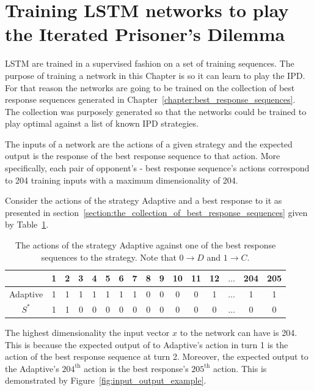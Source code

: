 \section{Training LSTM networks to play the Iterated Prisoner's Dilemma}\label{section:training_a_rnn}

LSTM are trained in a supervised fashion on a set of training sequences. The
purpose of training a network in this Chapter is so it can learn to play the
IPD. For that reason the networks are going to be trained on the collection of
best response sequences generated in
Chapter~\ref{chapter:best_response_sequences}. The collection was purposely generated
so that the networks could be trained to play optimal against a list of known
IPD strategies.

The inputs of a network are the actions of a given strategy and the expected
output is the response of the best response sequence to that action. More
specifically, each pair of opponent's - best response sequence's actions
correspond to 204 training inputs with a maximum dimensionality of 204.

Consider the actions of the strategy Adaptive and a best response to it as
presented in section~\ref{section:the_collection_of_best_response_sequences}
given by Table~\ref{table:adaptive_vs_best_response_binary_lstm}.

\begin{table}[htbp]
    \centering
    \begin{tabular}{cccccccccccccccc}
        & \textbf{1} & \textbf{2} & \textbf{3} & \textbf{4}  & \textbf{5} & \textbf{6} & \textbf{7} & \textbf{8} & \textbf{9} & \textbf{10} & \textbf{11} &  \textbf{12} & \(\dots\)  & \textbf{204} &  \textbf{205} \\ 
        \midrule
        Adaptive & 1 & 1 & 1 & 1 & 1 & 1 & 1 & 0 & 0 & 0 & 0& 1& \(\dots\) & 1 & 1 \\
        \(S^*\) & 1 & 1 & 0 & 0 & 0 & 0 & 0 & 0 & 0 & 0 & 0 & 0& \(\dots\) & 0 & 0 \\ \bottomrule
    \end{tabular}
    \caption{The actions of the strategy Adaptive against one of the best response sequences
    to the strategy. Note that \(0 \to D\) and \(1 \to C\).}\label{table:adaptive_vs_best_response_binary_lstm}
\end{table}

The highest dimensionality the input vector \(x\) to the network can have is
204. This is because the expected output of to Adaptive's action in turn 1 is
the action of the best response sequence at turn 2. Moreover, the expected
output to the Adaptive's \(204^{\text{th}}\) action is the best response's
\(205^{\text{th}}\) action. This is demonstrated by
Figure~\ref{fig:input_output_example}.


